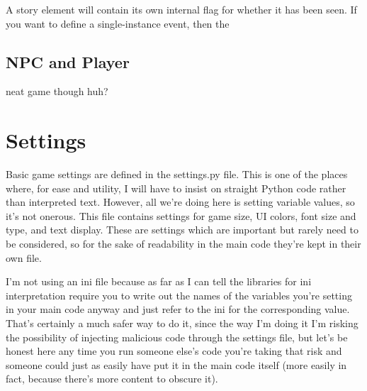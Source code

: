 \documentclass[11pt]{article}
\begin{document}
A story element will contain its own internal flag for whether it has been seen.
If you want to define a single-instance event, then the 
\subsection{NPC and Player}
neat game though huh?
\section{Settings}
Basic game settings are defined in the settings.py file.
This is one of the places where, for ease and utility, I will have to insist on straight Python code rather than interpreted text.
However, all we're doing here is setting variable values, so it's not onerous.
This file contains settings for game size, UI colors, font size and type, and text display.
These are settings which are important but rarely need to be considered, so for the sake of readability in the main code they're kept in their own file.

I'm not using an ini file because as far as I can tell the libraries for ini interpretation require you to write out the names of the variables you're setting in your main code anyway and just refer to the ini for the corresponding value.
That's certainly a much safer way to do it, since the way I'm doing it I'm risking the possibility of injecting malicious code through the settings file, but let's be honest here any time you run someone else's code you're taking that risk and someone could just as easily have put it in the main code itself (more easily in fact, because there's more content to obscure it).
\end{document}
